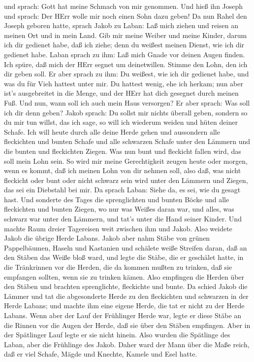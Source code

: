 und sprach: Gott hat meine Schmach von mir genommen.  Und
hieß ihn Joseph und sprach: Der HErr wolle mir noch einen Sohn dazu
geben!  Da nun Rahel den Joseph geboren hatte, sprach Jakob
zu Laban: Laß mich ziehen und reisen an meinen Ort und in mein Land.
 Gib mir meine Weiber und meine Kinder, darum ich dir
gedienet habe, daß ich ziehe; denn du weißest meinen Dienst, wie ich dir
gedienet habe.  Laban sprach zu ihm: Laß mich Gnade vor
deinen Augen finden. Ich spüre, daß mich der HErr segnet um
deinetwillen.  Stimme den Lohn, den ich dir geben soll.
 Er aber sprach zu ihm: Du weißest, wie ich dir gedienet
habe, und was du für Vieh hattest unter mir.  Du hattest
wenig, ehe ich herkam; nun aber ist's ausgebreitet in die Menge, und der
HErr hat dich gesegnet durch meinen Fuß. Und nun, wann soll ich auch
mein Haus versorgen?  Er aber sprach: Was soll ich dir denn
geben? Jakob sprach: Du sollst mir nichts überall geben, sondern so du
mir tun willst, das ich sage, so will ich wiederum weiden und hüten
deiner Schafe.  Ich will heute durch alle deine Herde gehen
und aussondern alle fleckichten und bunten Schafe und alle schwarzen
Schafe unter den Lämmern und die bunten und fleckichten Ziegen. Was nun
bunt und fleckicht fallen wird, das soll mein Lohn sein. 
So wird mir meine Gerechtigkeit zeugen heute oder morgen, wenn es kommt,
daß ich meinen Lohn von dir nehmen soll, also daß, was nicht fleckicht
oder bunt oder nicht schwarz sein wird unter den Lämmern und Ziegen, das
sei ein Diebstahl bei mir.  Da sprach Laban: Siehe da, es
sei, wie du gesagt hast.  Und sonderte des Tages die
sprenglichten und bunten Böcke und alle fleckichten und bunten Ziegen,
wo nur was Weißes daran war, und alles, was schwarz war unter den
Lämmern, und tat's unter die Hand seiner Kinder.  Und
machte Raum dreier Tagereisen weit zwischen ihm und Jakob. Also weidete
Jakob die übrige Herde Labans.  Jakob aber nahm Stäbe von
grünen Pappelbäumen, Haseln und Kastanien und schälete weiße Streifen
daran, daß an den Stäben das Weiße bloß ward,  und legte
die Stäbe, die er geschälet hatte, in die Tränkrinnen vor die Herden,
die da kommen mußten zu trinken, daß sie empfangen sollten, wenn sie zu
trinken kämen.  Also empfingen die Herden über den Stäben
und brachten sprenglichte, fleckichte und bunte.  Da schied
Jakob die Lämmer und tat die abgesonderte Herde zu den fleckichten und
schwarzen in der Herde Labans; und machte ihm eine eigene Herde, die tat
er nicht zu der Herde Labans.  Wenn aber der Lauf der
Frühlinger Herde war, legte er diese Stäbe an die Rinnen vor die Augen
der Herde, daß sie über den Stäben empfingen.  Aber in der
Spätlinger Lauf legte er sie nicht hinein. Also wurden die Spätlinge des
Laban, aber die Frühlinge des Jakob.  Daher ward der Mann
über die Maße reich, daß er viel Schafe, Mägde und Knechte, Kamele und
Esel hatte.

